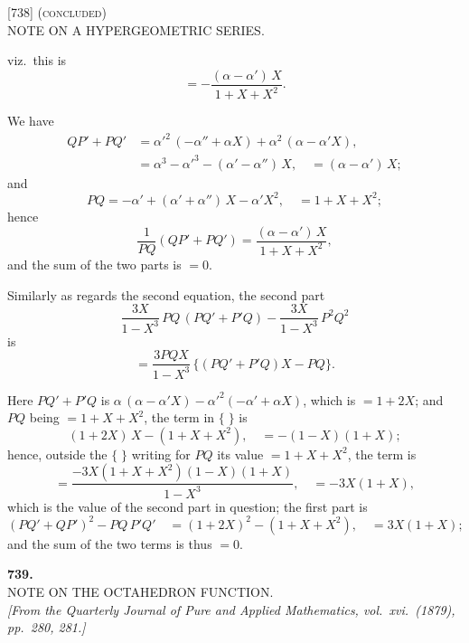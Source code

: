 \documentclass[11pt]{article}
\begin{document}
\begin{center}
\textsc{[738] (concluded)}\\[2pt]
\textsc{NOTE ON A HYPERGEOMETRIC SERIES.}
\end{center}

\bigskip

\noindent
viz.\ this is
\[
   = -\frac{(\alpha - \alpha')\,X}{1 + X + X^2}.
\]

We have
\begin{align*}
   QP' + PQ' &= \alpha'^2\,(-\alpha'' + \alpha X) + \alpha^2\,(\alpha - \alpha' X),\\
             &= \alpha^3 - \alpha'^3 - (\alpha' - \alpha'')\,X, \quad = (\alpha - \alpha')\,X;
\end{align*}
and
\[
   PQ = -\alpha' + (\alpha' + \alpha'')\,X - \alpha' X^2, \quad = 1 + X + X^2;
\]
hence
\[
   \frac{1}{PQ}(QP' + PQ') = \frac{(\alpha - \alpha')\,X}{1 + X + X^2},
\]
and the sum of the two parts is $= 0$.

\medskip

Similarly as regards the second equation, the second part
\[
   \frac{3X}{1 - X^3}\,PQ\,(PQ' + P'Q) - \frac{3X}{1 - X^3}\,P^2 Q^2
\]
is
\[
   = \frac{3PQX}{1 - X^3}\,\{(PQ' + P'Q)X - PQ\}.
\]

Here $PQ' + P'Q$ is $\alpha\,(\alpha - \alpha' X) - \alpha'^2(-\alpha' + \alpha X)$, which is $= 1 + 2X$; and
$PQ$ being $= 1 + X + X^2$, the term in $\{\;\}$ is
\[
   (1 + 2X)\,X - (1 + X + X^2), \quad = -(1 - X)(1 + X);
\]
hence, outside the $\{\;\}$ writing for $PQ$ its value $= 1 + X + X^2$, the term is
\[
   = \frac{-3X(1 + X + X^2)(1 - X)(1 + X)}{1 - X^3}, \quad = -3X(1 + X),
\]
which is the value of the second part in question; the first part is
\[
   (PQ' + QP')^2 - PQ\,P'Q' \quad = (1 + 2X)^2 - (1 + X + X^2), \quad = 3X(1 + X);
\]
and the sum of the two terms is thus $= 0$.

\bigskip

\begin{center}
\textbf{739.}\\[6pt]
\textsc{NOTE ON THE OCTAHEDRON FUNCTION.}\\[6pt]
\textit{[From the Quarterly Journal of Pure and Applied Mathematics, vol.\ xvi.\ (1879),\\
pp.\ 280, 281.]}
\end{center}
\end{document}
